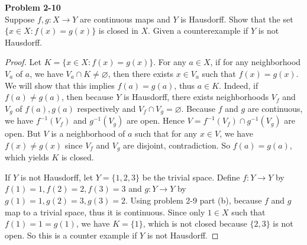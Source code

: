\documentclass[12pt, a4paper]{article}
\theoremstyle{plain}
\newenvironment{problem}[2][Problem]
    { \begin{mdframed}[backgroundcolor=gray!20] \textbf{#1 #2} \\}
    {  \end{mdframed}}
\begin{document}
\pagebreak

\begin{problem}{2-10}
Suppose $f,g:X\rightarrow Y$ are continuous maps and $Y$ is Hausdorff. Show that the set $\{x\in X:f(x)=g(x)\}$ is closed in $X$. Given a counterexample if $Y$ is not Hausdorff.
\end{problem}
	\begin{proof}
	Let $K=\{x\in X:f(x)=g(x)\}$. For any $a\in X$, if for any neighborhood $V_a$ of $a$, we have $V_a\cap K\neq \varnothing$, then there exists $x\in V_a$ such that $f(x)=g(x)$. We will show that this implies $f(a)=g(a)$, thus $a\in K$. Indeed, if $f(a)\neq g(a)$, then because $Y$ is Hausdorff, there exists neighborhoods $V_f$ and $V_g$ of $f(a),g(a)$ respectively and $V_f\cap V_g=\varnothing$. Because $f$ and $g$ are continuous, we have $f^{-1}(V_f)$ and $g^{-1}(V_g)$ are open. Hence $V=f^{-1}(V_f)\cap g^{-1}(V_g)$ are open. But $V$ is a neighborhood of $a$ such that for any $x\in V$, we have $f(x)\neq g(x)$ since $V_f$ and $V_g$ are disjoint, contradiction. So $f(a)=g(a)$, which yields $K$ is closed.
	
	If $Y$ is not Hausdorff, let $Y=\{1,2,3\}$ be the trivial space. Define $f:Y\rightarrow Y$ by $f(1)=1,f(2)=2,f(3)=3$ and $g:Y\rightarrow Y$ by $g(1)=1,g(2)=3,g(3)=2$. Using problem 2-9 part (b), because $f$ and $g$ map to a trivial space, thus it is continuous. Since only $1\in X$ such that $f(1)=1=g(1)$, we have $K=\{1\}$, which is not closed because $\{2,3\}$ is not open. So this is a counter example if $Y$ is not Hausdorff.
	\end{proof}
\end{document}
